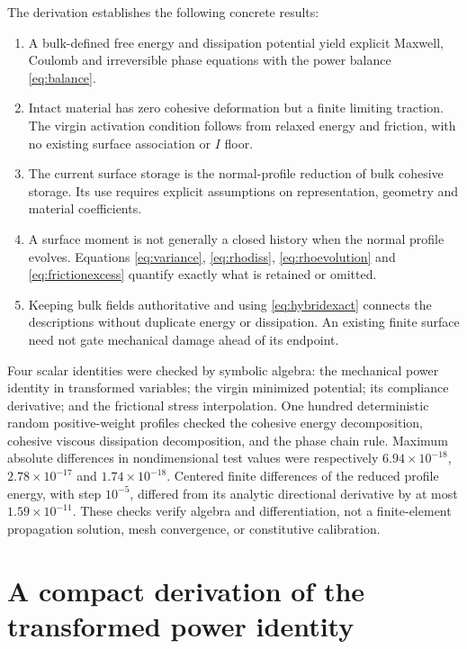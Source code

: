 \documentclass[11pt,a4paper]{article}
\numberwithin{equation}{section}
\begin{document}
The derivation establishes the following concrete results:
\begin{enumerate}
 \item A bulk-defined free energy and dissipation potential yield explicit
       Maxwell, Coulomb and irreversible phase equations with the power
       balance \eqref{eq:balance}.
 \item Intact material has zero cohesive deformation but a finite limiting
       traction. The virgin activation condition follows from relaxed energy
       and friction, with no existing surface association or $I$ floor.
 \item The current surface storage is the normal-profile reduction of bulk
       cohesive storage. Its use requires explicit assumptions on
       representation, geometry and material coefficients.
 \item A surface moment is not generally a closed history when the normal
       profile evolves. Equations \eqref{eq:variance},
       \eqref{eq:rhodiss}, \eqref{eq:rhoevolution} and
       \eqref{eq:frictionexcess} quantify exactly what is retained or omitted.
 \item Keeping bulk fields authoritative and using
       \eqref{eq:hybridexact} connects the descriptions without duplicate
       energy or dissipation. An existing finite surface need not gate
       mechanical damage ahead of its endpoint.
\end{enumerate}

Four scalar identities were checked by symbolic algebra: the mechanical
power identity in transformed variables; the virgin minimized potential;
its compliance derivative; and the frictional stress interpolation.
One hundred deterministic random positive-weight profiles checked the
cohesive energy decomposition, cohesive viscous dissipation decomposition,
and the phase chain rule. Maximum absolute differences in nondimensional
test values were respectively $6.94\times10^{-18}$,
$2.78\times10^{-17}$ and $1.74\times10^{-18}$.
Centered finite differences of the reduced profile energy, with step
$10^{-5}$, differed from its analytic directional derivative by at most
$1.59\times10^{-11}$.
These checks verify algebra and differentiation, not a finite-element
propagation solution, mesh convergence, or constitutive calibration.

\appendix
\section{A compact derivation of the transformed power identity}
\end{document}
